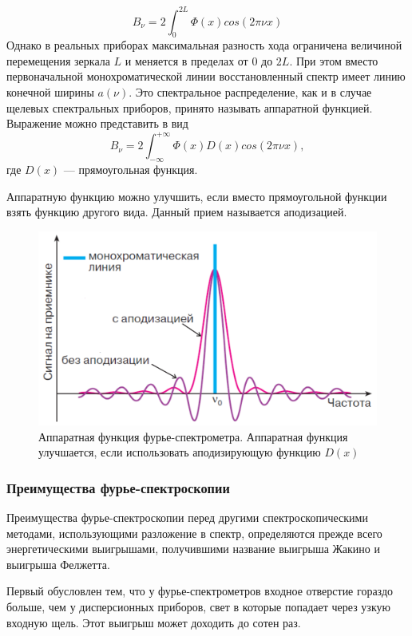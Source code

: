 \begin{equation}
B_{\nu} = 2\int_{0}^{2L}\Phi(x)cos(2\pi\nu x)
\end{equation}
Однако в реальных приборах максимальная разность хода ограничена величиной перемещения зеркала $L$ и меняется в пределах от 0 до
$2L$. При этом вместо первоначальной монохроматической линии
восстановленный спектр имеет линию конечной ширины $a(\nu)$. Это
спектральное распределение, как и в случае щелевых спектральных
приборов, принято называть аппаратной функцией. Выражение
можно представить в вид
\begin{equation}
B_{\nu} = 2\int_{-\infty}^{+\infty}\Phi(x)D(x)cos(2\pi\nu x),  
\end{equation}
где $D(x)$ --- прямоугольная функция.

Аппаратную функцию можно улучшить, если вместо прямоугольной
функции взять функцию другого вида. Данный прием называется
аподизацией.
\begin{figure}[h!]
	\centering
	\includegraphics[width=0.7\linewidth]{apotis_graph}
	\caption{Аппаратная функция фурье-спектрометра. Аппаратная функция
		улучшается, если использовать аподизирующую функцию $D(x)$}
	\label{PR:apotis_pg}
\end{figure}
\subsubsection{Преимущества фурье-спектроскопии}
Преимущества фурье-спектроскопии перед другими спектроскопическими методами, использующими разложение в спектр, определяются прежде всего энергетическими выигрышами, получившими название выигрыша Жакино и выигрыша Фелжетта.

Первый обусловлен тем, что у фурье-спектрометров входное отверстие гораздо больше, чем у дисперсионных приборов, свет в которые
попадает через узкую входную щель. Этот выигрыш  может доходить до сотен раз.

